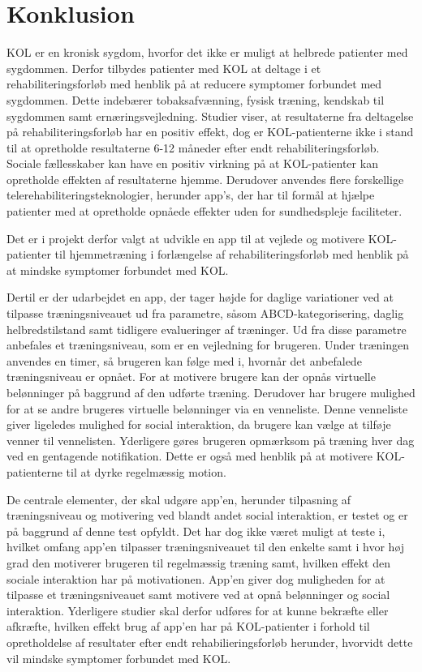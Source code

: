 \section{Konklusion}
KOL er en kronisk sygdom, hvorfor det ikke er muligt at helbrede patienter med sygdommen. Derfor tilbydes patienter med KOL at deltage i et rehabiliteringsforløb med henblik på at reducere symptomer forbundet med sygdommen. Dette indebærer tobaksafvænning, fysisk træning, kendskab til sygdommen samt ernæringsvejledning. Studier viser, at resultaterne fra deltagelse på rehabiliteringsforløb har en positiv effekt, dog er KOL-patienterne ikke i stand til at opretholde resultaterne 6-12 måneder efter endt rehabiliteringsforløb. Sociale fællesskaber kan have en positiv virkning på at KOL-patienter kan opretholde effekten af resultaterne hjemme. Derudover anvendes flere forskellige telerehabiliteringsteknologier, herunder app’s, der har til formål at hjælpe patienter med at opretholde opnåede effekter uden for sundhedspleje faciliteter. 

Det er i projekt derfor valgt at udvikle en app til at vejlede og motivere KOL-patienter til hjemmetræning i forlængelse af rehabiliteringsforløb med henblik på at mindske symptomer forbundet med KOL.

Dertil er der udarbejdet en app, der tager højde for daglige variationer ved at tilpasse træningsniveauet ud fra parametre, såsom ABCD-kategorisering, daglig helbredstilstand samt tidligere evalueringer af træninger. Ud fra disse parametre anbefales et træningsniveau, som er en vejledning for brugeren. Under træningen anvendes en timer, så brugeren kan følge med i, hvornår det anbefalede træningsniveau er opnået. For at motivere brugere kan der opnås virtuelle belønninger på baggrund af den udførte træning. Derudover har brugere mulighed for at se andre brugeres virtuelle belønninger via en venneliste. Denne venneliste giver ligeledes mulighed for social interaktion, da brugere kan vælge at tilføje venner til vennelisten. Yderligere gøres brugeren opmærksom på træning hver dag ved en gentagende notifikation. Dette er også med henblik på at motivere KOL-patienterne til at dyrke regelmæssig motion.  

De centrale elementer, der skal udgøre app’en, herunder tilpasning af træningsniveau og motivering ved blandt andet social interaktion, er testet og er på baggrund af denne test opfyldt. Det har dog ikke været muligt at teste i, hvilket omfang app’en tilpasser træningsniveauet til den enkelte samt i hvor høj grad den motiverer brugeren til regelmæssig træning samt, hvilken effekt den sociale interaktion har på motivationen. App’en giver dog muligheden for at tilpasse et træningsniveauet samt motivere ved at opnå belønninger og social interaktion. Yderligere studier skal derfor udføres for at kunne bekræfte eller afkræfte, hvilken effekt brug af app’en har på KOL-patienter i forhold til opretholdelse af resultater efter endt rehabilieringsforløb herunder, hvorvidt dette vil mindske symptomer forbundet med KOL. 